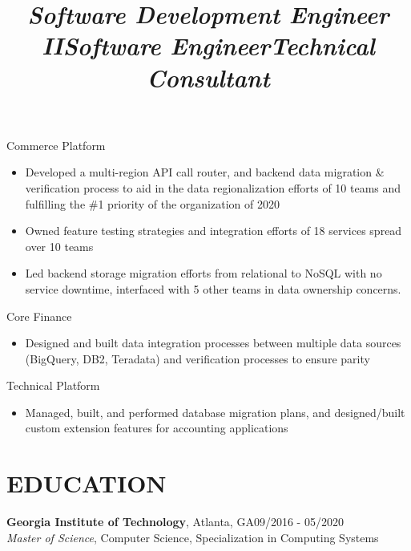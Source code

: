 \documentclass[margin,11pt]{res}
\begin{document}
\begin{resume}
\title{\sl{Software Development Engineer II}}
\begin{position}
Commerce Platform\\
\begin{itemize}
\item Developed a multi-region API call router, and backend data migration \& verification process to aid in the data regionalization efforts of 10 teams and fulfilling the \#1 priority of the organization of 2020
\item Owned feature testing strategies and integration efforts of 18 services spread over 10 teams
\item Led backend storage migration efforts from relational to NoSQL with no service downtime, interfaced with 5 other teams in data ownership concerns.
\end{itemize}
\end{position}


\title{\sl{Software Engineer}}
\begin{position}
Core Finance\\
\begin{itemize}
\item Designed and built data integration processes between multiple data sources (BigQuery, DB2, Teradata) and verification processes to ensure parity
\end{itemize}
\end{position}


\title{\sl{Technical Consultant}}
\begin{position}
Technical Platform\\
\begin{itemize}
\item Managed, built, and performed database migration plans, and designed/built custom extension features for accounting applications
\end{itemize}
\end{position}

\section{EDUCATION}
\textbf{Georgia Institute of Technology}, Atlanta, GA\hfill 09/2016 - 05/2020\\
{\sl Master of Science}, Computer Science, Specialization in Computing Systems\\


\end{resume}
\end{document}
